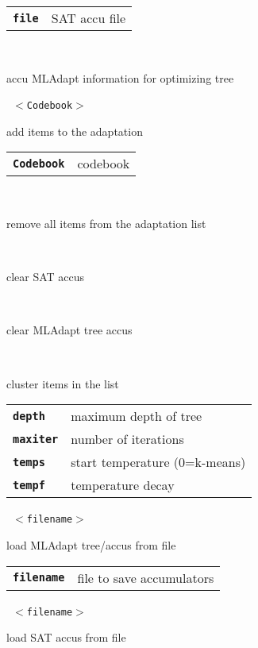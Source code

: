 \begin{description}
\begin{description}
      \begin{tabular}{ll}
 \texttt{\textbf{file}} &  SAT accu file  \\
      \end{tabular}
       \texttt{} \

        accu MLAdapt information for optimizing tree

       \texttt{ $<$Codebook$>$} \

        add items to the adaptation

      \begin{tabular}{ll}
 \texttt{\textbf{Codebook}} &  codebook \\
      \end{tabular}
       \texttt{} \

        remove all items from the adaptation list

       \texttt{} \

        clear SAT accus

       \texttt{} \

        clear MLAdapt tree accus

       \texttt{    } \

        cluster items in the list

      \begin{tabular}{ll}
 \texttt{\textbf{depth}} &    maximum depth of tree  \\
 \texttt{\textbf{maxiter}} &  number of iterations  \\
 \texttt{\textbf{temps}} &    start temperature (0=k-means)  \\
 \texttt{\textbf{tempf}} &    temperature decay  \\
      \end{tabular}
       \texttt{ $<$filename$>$} \

        load MLAdapt tree/accus from file

      \begin{tabular}{ll}
 \texttt{\textbf{filename}} &  file to save accumulators  \\
      \end{tabular}
       \texttt{ $<$filename$>$} \

        load SAT accus from file


\end{description}
\end{description}

